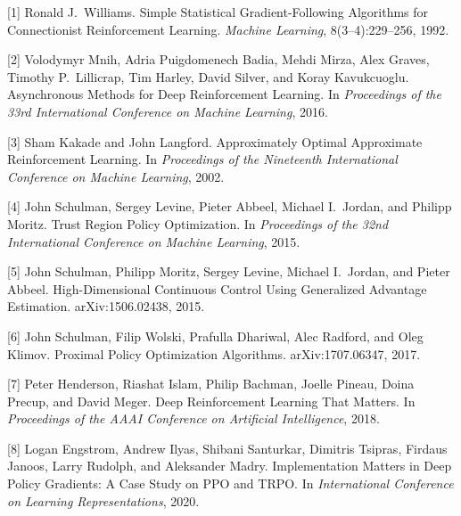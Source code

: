 \documentclass{article}
\begin{document}
{\small

[1] Ronald J.~Williams. Simple Statistical Gradient-Following Algorithms for Connectionist Reinforcement Learning. \emph{Machine Learning}, 8(3--4):229--256, 1992.

[2] Volodymyr Mnih, Adria Puigdomenech Badia, Mehdi Mirza, Alex Graves, Timothy P.~Lillicrap, Tim Harley, David Silver, and Koray Kavukcuoglu. Asynchronous Methods for Deep Reinforcement Learning. In \emph{Proceedings of the 33rd International Conference on Machine Learning}, 2016.

[3] Sham Kakade and John Langford. Approximately Optimal Approximate Reinforcement Learning. In \emph{Proceedings of the Nineteenth International Conference on Machine Learning}, 2002.

[4] John Schulman, Sergey Levine, Pieter Abbeel, Michael I.~Jordan, and Philipp Moritz. Trust Region Policy Optimization. In \emph{Proceedings of the 32nd International Conference on Machine Learning}, 2015.

[5] John Schulman, Philipp Moritz, Sergey Levine, Michael I.~Jordan, and Pieter Abbeel. High-Dimensional Continuous Control Using Generalized Advantage Estimation. arXiv:1506.02438, 2015.

[6] John Schulman, Filip Wolski, Prafulla Dhariwal, Alec Radford, and Oleg Klimov. Proximal Policy Optimization Algorithms. arXiv:1707.06347, 2017.

[7] Peter Henderson, Riashat Islam, Philip Bachman, Joelle Pineau, Doina Precup, and David Meger. Deep Reinforcement Learning That Matters. In \emph{Proceedings of the AAAI Conference on Artificial Intelligence}, 2018.

[8] Logan Engstrom, Andrew Ilyas, Shibani Santurkar, Dimitris Tsipras, Firdaus Janoos, Larry Rudolph, and Aleksander Madry. Implementation Matters in Deep Policy Gradients: A Case Study on PPO and TRPO. In \emph{International Conference on Learning Representations}, 2020.

}
\end{document}
